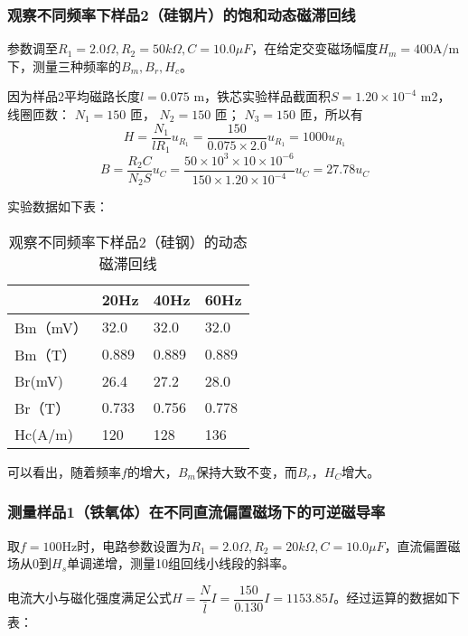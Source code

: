 \documentclass[11pt]{article}
\begin{document}
\subsubsection{观察不同频率下样品2（硅钢片）的饱和动态磁滞回线}

参数调至$R_1=2.0\Omega,R_2=50k\Omega,C=10.0\mu F$，在给定交变磁场幅度$H_m=400\text{A}/\text{m}$下，测量三种频率的$B_m,B_r,H_c$。

因为样品2平均磁路长度$l =0.075$ m，铁芯实验样品截面积$S =1.20\times 10^{-4}$ m2，线圈匝数： $N_1 =150$ 匝， $N_2 =150$ 匝； $N_3 =150$ 匝，所以有
\[
    H = \dfrac{N_1}{lR_1} u_{R_1} = \dfrac{150}{0.075\times 2.0} u_{R_1} = 1000 u_{R_1}
\]
\[
    B = \dfrac{R_2 C}{N_2 S} u_C = \dfrac{50\times 10^3\times 10\times 10^{-6}}{150\times 1.20\times 10^{-4}} u_C = 27.78 u_C
\]

实验数据如下表：

\begin{table}[H]
	\centering
	\begin{tabular}{|l|l|l|l|}
		\hline
		& 20Hz    & 40Hz    & 60Hz    \\ \hline
		Bm（mV）  & 32.0  & 32.0  & 32.0  \\ \hline
		Bm（T）   & 0.889 & 0.889 & 0.889 \\ \hline
		Br(mV)  & 26.4  & 27.2  & 28.0 \\ \hline
		Br（T）   & 0.733 & 0.756 & 0.778 \\ \hline
		Hc(A/m) & 120    & 128    & 136   \\ \hline
	\end{tabular}
	\caption{观察不同频率下样品2（硅钢）的动态磁滞回线}
\end{table}

可以看出，随着频率$f$的增大，$B_m$保持大致不变，而$B_r$，$H_C$增大。

\subsubsection{测量样品1（铁氧体）在不同直流偏置磁场下的可逆磁导率}

取$f=100\text{Hz}$时，电路参数设置为$R_1=2.0\Omega,R_2=20k\Omega,C=10.0\mu F$，直流偏置磁场从$0$到$H_s$单调递增，测量10组回线小线段的斜率。

电流大小与磁化强度满足公式$H = \dfrac{N}{\bar{l}} I = \dfrac{150}{0.130} I = 1153.85 I$。经过运算的数据如下表：
\end{document}
